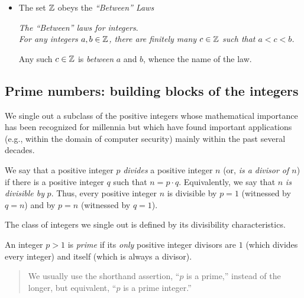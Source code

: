 \begin{itemize}
{\it The discreteness of the integers.} \\
%
{\it For every integer $a \in \Z$, there is no integer between $a$ and
  $a+1$; i.e., there is no $b \in \Z$ such that $a < b < a+1$.}

\medskip

\item
The set $\mathbb{Z}$ obeys the {\it ``Between'' Laws}

\medskip

{\it The ``Between'' laws for integers}. \\
%
{\it For any integers $a, b \in \mathbb{Z}$, there are finitely many $c \in
  \mathbb{Z}$ such that $a < c < b$.}

\smallskip

Any such $c \in \mathbb{Z}$ is {\em between} $a$ and $b$, whence the name of
the law.
\end{itemize}

\subsection{Prime numbers: building blocks of the integers}
\label{sec:primes}

We single out a subclass of the positive integers whose mathematical
importance has been recognized for millennia but which have found
important applications (e.g., within the domain of computer security)
mainly within the past several decades.

We say that a positive integer $p$ {\it divides} a positive integer
$n$ (or, {\it is a divisor of $n$}) if
there is a positive integer $q$ such that $n = p \cdot q$.
Equivalently, we say that $n$ {\it is divisible
  by} $p$.  Thus, every positive
integer $n$ is divisible by $p=1$ (witnessed by $q=n$) and by $p=n$
(witnessed by $q=1$).

The class of integers we single out is defined by its divisibility
characteristics.

An integer $p >1$ is {\it prime}
if its {\em only} positive integer divisors are $1$ (which divides
every integer) and itself (which is always a divisor).
\begin{quote}
We usually use the shorthand assertion, ``$p$ is a prime,'' instead of
the longer, but equivalent, ``$p$ is a prime integer.''
\end{quote}


